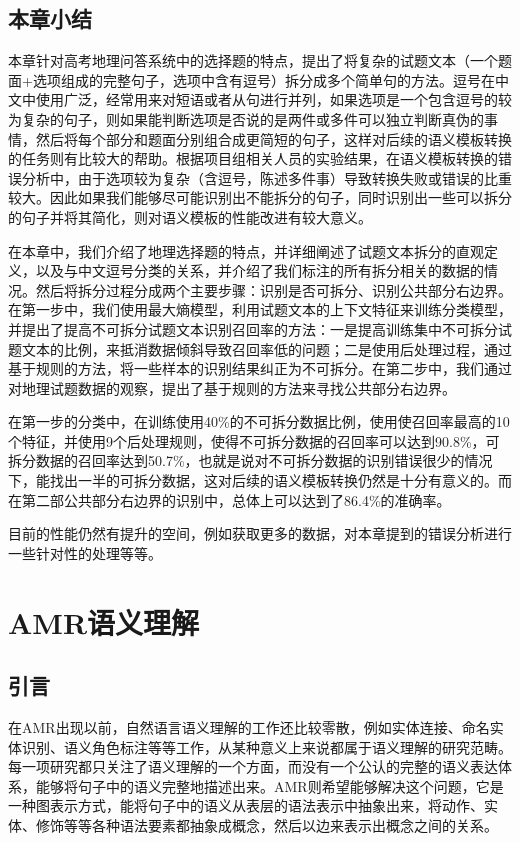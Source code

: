 \documentclass[master, winfont]{njuthesis}
\begin{document}
\section{本章小结}
本章针对高考地理问答系统中的选择题的特点，提出了将复杂的试题文本（一个题面+选项组成的完整句子，选项中含有逗号）拆分成多个简单句的方法。逗号在中文中使用广泛，经常用来对短语或者从句进行并列，如果选项是一个包含逗号的较为复杂的句子，则如果能判断选项是否说的是两件或多件可以独立判断真伪的事情，然后将每个部分和题面分别组合成更简短的句子，这样对后续的语义模板转换的任务则有比较大的帮助。根据项目组相关人员的实验结果，在语义模板转换的错误分析中，由于选项较为复杂（含逗号，陈述多件事）导致转换失败或错误的比重较大。因此如果我们能够尽可能识别出不能拆分的句子，同时识别出一些可以拆分的句子并将其简化，则对语义模板的性能改进有较大意义。

在本章中，我们介绍了地理选择题的特点，并详细阐述了试题文本拆分的直观定义，以及与中文逗号分类的关系，并介绍了我们标注的所有拆分相关的数据的情况。然后将拆分过程分成两个主要步骤：识别是否可拆分、识别公共部分右边界。在第一步中，我们使用最大熵模型，利用试题文本的上下文特征来训练分类模型，并提出了提高不可拆分试题文本识别召回率的方法：一是提高训练集中不可拆分试题文本的比例，来抵消数据倾斜导致召回率低的问题；二是使用后处理过程，通过基于规则的方法，将一些样本的识别结果纠正为不可拆分。在第二步中，我们通过对地理试题数据的观察，提出了基于规则的方法来寻找公共部分右边界。

在第一步的分类中，在训练使用40\%的不可拆分数据比例，使用使召回率最高的10个特征，并使用9个后处理规则，使得不可拆分数据的召回率可以达到90.8\%，可拆分数据的召回率达到50.7\%，也就是说对不可拆分数据的识别错误很少的情况下，能找出一半的可拆分数据，这对后续的语义模板转换仍然是十分有意义的。而在第二部公共部分右边界的识别中，总体上可以达到了86.4\%的准确率。

目前的性能仍然有提升的空间，例如获取更多的数据，对本章提到的错误分析进行一些针对性的处理等等。

\chapter{AMR语义理解}
\label{chapter:amr}
\section{引言}
在AMR出现以前，自然语言语义理解的工作还比较零散，例如实体连接、命名实体识别、语义角色标注等等工作，从某种意义上来说都属于语义理解的研究范畴。每一项研究都只关注了语义理解的一个方面，而没有一个公认的完整的语义表达体系，能够将句子中的语义完整地描述出来。AMR则希望能够解决这个问题，它是一种图表示方式，能将句子中的语义从表层的语法表示中抽象出来，将动作、实体、修饰等等各种语法要素都抽象成概念，然后以边来表示出概念之间的关系。
\end{document}
